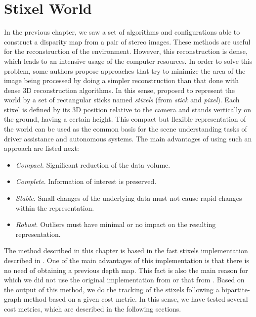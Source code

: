 
\graphicspath{{./images/chapter04/bmps/}{./images/chapter04/vects/}{./images/chapter04/}}

\chapter{Stixel World}\label{ch:chapter04}

In the previous chapter, we saw a set of algorithms and configurations able to construct a disparity map from a pair of stereo images. These methods are useful for the reconstruction of the environment. However, this reconstruction is dense, which leads to an intensive usage of the computer resources. In order to solve this problem, some authors propose approaches that try to minimize the area of the image being processed by doing a simpler reconstruction than that done with dense 3D reconstruction algorithms. In this sense, \cite{badino2009stixel} proposed to represent the world by a set of rectangular sticks named \emph{stixels} (from \emph{stick} and \emph{pixel}). Each stixel is defined by its 3D position relative to the camera and stands vertically on the ground, having a certain height.
This compact but flexible representation of the world can be used as the common basis for the scene understanding tasks of driver assistance and autonomous systems. The main advantages of using such an approach are listed next:
\begin{itemize}
 \item \emph{Compact}. Significant reduction of the data volume.
 \item \emph{Complete}. Information of interest is preserved.
 \item \emph{Stable}. Small changes of the underlying data must not cause rapid changes within the representation.
 \item \emph{Robust}. Outliers must have minimal or no impact on the resulting representation.
\end{itemize}

The method described in this chapter is based in the fast stixels implementation described in \cite{benenson2012pedestrian}. One of the main advantages of this implementation is that there is no need of obtaining a previous depth map. This fact is also the main reason for which we did not use the original implementation from \cite{badino2009stixel} or that from \cite{pfeiffer2010efficient}. Based on the output of this method, we do the tracking of the stixels following a bipartite-graph method based on a given cost metric. In this sense, we have tested several cost metrics, which are described in the following sections.

